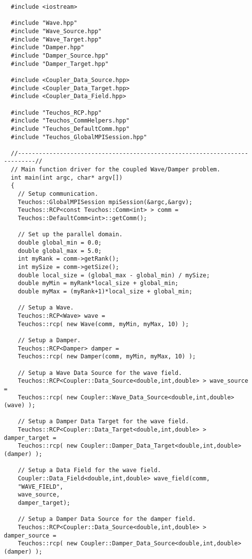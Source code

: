 \documentclass[letterpaper]{article}
\begin{document}
\begin{lstlisting}
  #include <iostream>

  #include "Wave.hpp"
  #include "Wave_Source.hpp"
  #include "Wave_Target.hpp"
  #include "Damper.hpp"
  #include "Damper_Source.hpp"
  #include "Damper_Target.hpp"

  #include <Coupler_Data_Source.hpp>
  #include <Coupler_Data_Target.hpp>
  #include <Coupler_Data_Field.hpp>

  #include "Teuchos_RCP.hpp"
  #include "Teuchos_CommHelpers.hpp"
  #include "Teuchos_DefaultComm.hpp"
  #include "Teuchos_GlobalMPISession.hpp"

  //---------------------------------------------------------------------------//
  // Main function driver for the coupled Wave/Damper problem.
  int main(int argc, char* argv[])
  {
    // Setup communication.
    Teuchos::GlobalMPISession mpiSession(&argc,&argv);
    Teuchos::RCP<const Teuchos::Comm<int> > comm = 
    Teuchos::DefaultComm<int>::getComm();

    // Set up the parallel domain.
    double global_min = 0.0;
    double global_max = 5.0;
    int myRank = comm->getRank();
    int mySize = comm->getSize();
    double local_size = (global_max - global_min) / mySize;
    double myMin = myRank*local_size + global_min;
    double myMax = (myRank+1)*local_size + global_min;

    // Setup a Wave.
    Teuchos::RCP<Wave> wave =
    Teuchos::rcp( new Wave(comm, myMin, myMax, 10) );

    // Setup a Damper.
    Teuchos::RCP<Damper> damper =
    Teuchos::rcp( new Damper(comm, myMin, myMax, 10) ); 

    // Setup a Wave Data Source for the wave field.
    Teuchos::RCP<Coupler::Data_Source<double,int,double> > wave_source = 
    Teuchos::rcp( new Coupler::Wave_Data_Source<double,int,double>(wave) );

    // Setup a Damper Data Target for the wave field.
    Teuchos::RCP<Coupler::Data_Target<double,int,double> > damper_target = 
    Teuchos::rcp( new Coupler::Damper_Data_Target<double,int,double>(damper) );

    // Setup a Data Field for the wave field.
    Coupler::Data_Field<double,int,double> wave_field(comm,
    "WAVE_FIELD",
    wave_source,
    damper_target);

    // Setup a Damper Data Source for the damper field.
    Teuchos::RCP<Coupler::Data_Source<double,int,double> > damper_source = 
    Teuchos::rcp( new Coupler::Damper_Data_Source<double,int,double>(damper) );


\end{lstlisting}
\end{document}
